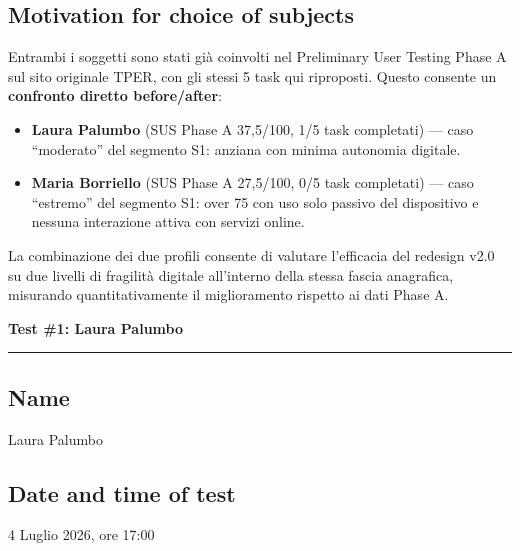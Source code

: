﻿\documentclass[11pt,a4paper]{article}
\begin{document}
\subsection*{Motivation for choice of subjects}
\begin{tcolorbox}[base]
Entrambi i soggetti sono stati già coinvolti nel Preliminary
User Testing Phase A sul sito originale TPER, con gli stessi
5 task qui riproposti. Questo consente un \textbf{confronto
diretto before/after}:

\begin{itemize}[leftmargin=*]
  \item \textbf{Laura Palumbo} (SUS Phase A 37,5/100, 1/5 task
  completati) --- caso ``moderato'' del segmento S1: anziana
  con minima autonomia digitale.
  \item \textbf{Maria Borriello} (SUS Phase A 27,5/100, 0/5 task
  completati) --- caso ``estremo'' del segmento S1: over 75
  con uso solo passivo del dispositivo e nessuna interazione
  attiva con servizi online.
\end{itemize}

La combinazione dei due profili consente di valutare l'efficacia
del redesign v2.0 su due livelli di fragilità digitale all'interno
della stessa fascia anagrafica, misurando quantitativamente il
miglioramento rispetto ai dati Phase A.
\end{tcolorbox}


\newpage
\begin{center}
  {\color{primaryColor}\large\bfseries Test \#1: Laura Palumbo}\\
  \vspace{0.1cm}
  \color{borderColor}\hrule
\end{center}

\vspace{0.5cm}

\subsection*{Name}
\begin{tcolorbox}[base]
Laura Palumbo
\end{tcolorbox}

\subsection*{Date and time of test}
\begin{tcolorbox}[base]
4 Luglio 2026, ore 17:00
\end{tcolorbox}
\end{document}
